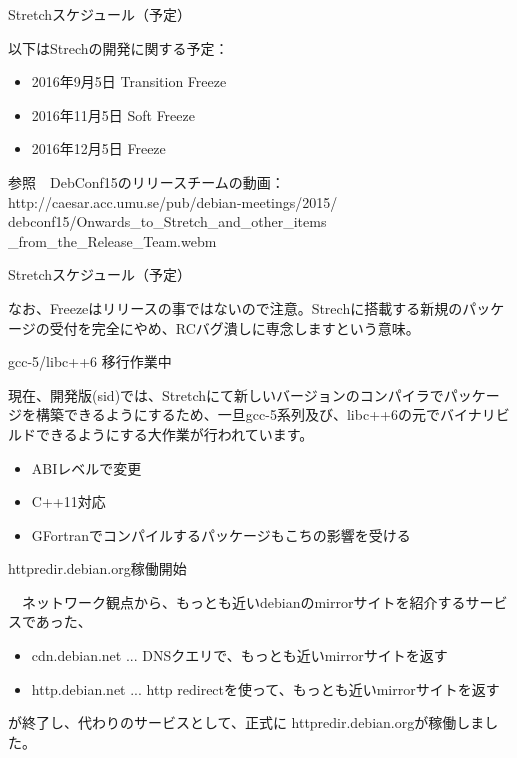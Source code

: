 \begin{frame}{Stretchスケジュール（予定）}

以下はStrechの開発に関する予定：

\begin{itemize}
  \item 2016年9月5日 Transition Freeze
  \item 2016年11月5日 Soft Freeze
  \item 2016年12月5日 Freeze
\end{itemize}

参照　DebConf15のリリースチームの動画：
http://caesar.acc.umu.se/pub/debian-meetings/2015/\\
debconf15/Onwards\_to\_Stretch\_and\_other\_items\\
\_from\_the\_Release\_Team.webm

\end{frame}

\begin{frame}{Stretchスケジュール（予定）}

 なお、Freezeはリリースの事ではないので注意。Strechに搭載する新規のパッケージの受付を完全にやめ、RCバグ潰しに専念しますという意味。
  
\end{frame}

\begin{frame}{gcc-5/libc++6 移行作業中}

 現在、開発版(sid)では、Stretchにて新しいバージョンのコンパイラでパッケージを構築できるようにするため、一旦gcc-5系列及び、libc++6の元でバイナリビルドできるようにする大作業が行われています。

\begin{itemize} 
\item ABIレベルで変更
\item C++11対応
\item GFortranでコンパイルするパッケージもこちの影響を受ける
\end{itemize}

\end{frame}

\begin{frame}{httpredir.debian.org稼働開始}

　ネットワーク観点から、もっとも近いdebianのmirrorサイトを紹介するサービスであった、
\begin{itemize}
  \item cdn.debian.net ... DNSクエリで、もっとも近いmirrorサイトを返す
  \item http.debian.net ... http redirectを使って、もっとも近いmirrorサイトを返す
\end{itemize}
が終了し、代わりのサービスとして、正式に httpredir.debian.orgが稼働しました。

\end{frame}

